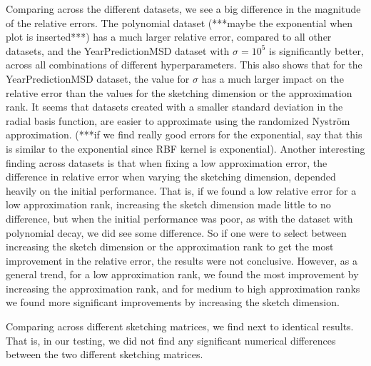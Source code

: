 \documentclass{article}
\theoremstyle{definition}
\begin{document}
Comparing across the different datasets, we see a big difference in the magnitude of the relative errors. The polynomial dataset (***maybe the exponential when plot is inserted***) has a much larger relative error, compared to all other datasets, and the YearPredictionMSD dataset with $\sigma=10^5$ is significantly better, across all combinations of different hyperparameters. This also shows that for the YearPredictionMSD dataset, the value for $\sigma$ has a much larger impact on the relative error than the values for the sketching dimension or the approximation rank. It seems that datasets created with a smaller standard deviation in the radial basis function, are easier to approximate using the randomized Nyström approximation. (***if we find really good errors for the exponential, say that this is similar to the exponential since RBF kernel is exponential). Another interesting finding across datasets is that when fixing a low approximation error, the difference in relative error when varying the sketching dimension, depended heavily on the initial performance. That is, if we found a low relative error for a low approximation rank, increasing the sketch dimension made little to no difference, but when the initial performance was poor, as with the dataset with polynomial decay, we did see some difference. So if one were to select between increasing the sketch dimension or the approximation rank to get the most improvement in the relative error, the results were not conclusive. However, as a general trend, for a low approximation rank, we found the most improvement by increasing the approximation rank, and for medium to high approximation ranks we found more significant improvements by increasing the sketch dimension.\newline

Comparing across different sketching matrices, we find next to identical results. That is, in our testing, we did not find any significant numerical differences between the two different sketching matrices.

\end{document}

